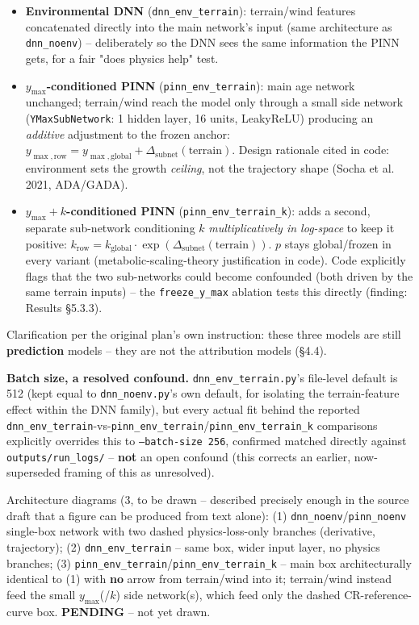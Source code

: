 \documentclass[11pt,a4paper]{report}
\begin{document}
\begin{itemize}
\setlength\itemsep{0pt}
\item \textbf{Environmental DNN} (\texttt{dnn\_env\_terrain}): terrain/wind features concatenated
directly into the main network's input (same architecture as \texttt{dnn\_noenv}) -- deliberately
so the DNN sees the same information the PINN gets, for a fair "does physics help" test.
\item \textbf{$y_{\max}$-conditioned PINN} (\texttt{pinn\_env\_terrain}): main age network
unchanged; terrain/wind reach the model only through a small side network (\texttt{YMaxSubNetwork}:
1 hidden layer, 16 units, LeakyReLU) producing an \emph{additive} adjustment to the frozen anchor:
$y_{\max,\text{row}} = y_{\max,\text{global}} + \Delta_{\text{subnet}}(\text{terrain})$. Design
rationale cited in code: environment sets the growth \emph{ceiling}, not the trajectory shape
(Socha et al. 2021, ADA/GADA).
\item \textbf{$y_{\max}+k$-conditioned PINN} (\texttt{pinn\_env\_terrain\_k}): adds a second,
separate sub-network conditioning $k$ \emph{multiplicatively in log-space} to keep it positive:
$k_{\text{row}} = k_{\text{global}}\cdot \exp(\Delta_{\text{subnet}}(\text{terrain}))$. $p$ stays
global/frozen in every variant (metabolic-scaling-theory justification in code). Code explicitly
flags that the two sub-networks could become confounded (both driven by the same terrain inputs)
-- the \texttt{freeze\_y\_max} ablation tests this directly (finding: Results \S5.3.3).
\end{itemize}

Clarification per the original plan's own instruction: these three models are still
\textbf{prediction} models -- they are not the attribution models (\S4.4).

\textbf{Batch size, a resolved confound.} \texttt{dnn\_env\_terrain.py}'s file-level default is
512 (kept equal to \texttt{dnn\_noenv.py}'s own default, for isolating the terrain-feature effect
within the DNN family), but every actual fit behind the reported
\texttt{dnn\_env\_terrain}-vs-\texttt{pinn\_env\_terrain}/\texttt{pinn\_env\_terrain\_k}
comparisons explicitly overrides this to \texttt{--batch-size 256}, confirmed matched directly
against \texttt{outputs/run\_logs/} -- \textbf{not} an open confound (this corrects an earlier,
now-superseded framing of this as unresolved).

Architecture diagrams (3, to be drawn -- described precisely enough in the source draft that a
figure can be produced from text alone): (1) \texttt{dnn\_noenv}/\texttt{pinn\_noenv} single-box
network with two dashed physics-loss-only branches (derivative, trajectory); (2)
\texttt{dnn\_env\_terrain} -- same box, wider input layer, no physics branches; (3)
\texttt{pinn\_env\_terrain}/\texttt{pinn\_env\_terrain\_k} -- main box architecturally identical to
(1) with \textbf{no} arrow from terrain/wind into it; terrain/wind instead feed the small
$y_{\max}$(/$k$) side network(s), which feed only the dashed CR-reference-curve box. \textbf{PENDING}
-- not yet drawn.
\end{document}
